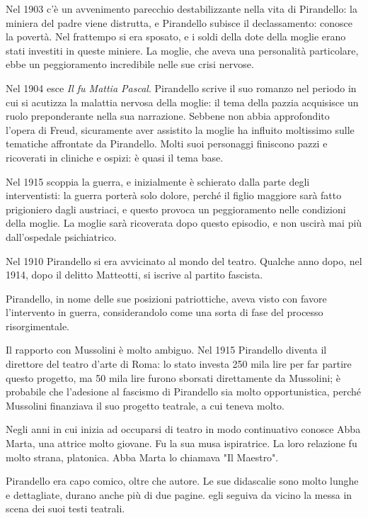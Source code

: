 \documentclass[a4paper, twoside, titlepage]{book}
\begin{document}
Nel 1903 c'è un avvenimento parecchio destabilizzante nella vita di Pirandello: la miniera del padre viene distrutta, e Pirandello subisce il declassamento: conosce la povertà. Nel frattempo si era sposato, e i soldi della dote della moglie erano stati investiti in queste miniere.
La moglie, che aveva una personalità particolare, ebbe un peggioramento incredibile nelle sue crisi nervose.

Nel 1904 esce \textit{Il fu Mattia Pascal}. Pirandello scrive il suo romanzo nel periodo in cui si acutizza la malattia nervosa della moglie: il tema della pazzia acquisisce un ruolo preponderante nella sua narrazione.
Sebbene non abbia approfondito l'opera di Freud, sicuramente aver assistito la moglie ha influito moltissimo sulle tematiche affrontate da Pirandello. Molti suoi personaggi finiscono pazzi e ricoverati in cliniche e ospizi: è quasi il tema base.

Nel 1915 scoppia la guerra, e inizialmente è schierato dalla parte degli interventisti: la guerra porterà solo dolore, perché il figlio maggiore sarà fatto prigioniero dagli austriaci, e questo provoca un peggioramento nelle condizioni della moglie.
La moglie sarà ricoverata dopo questo episodio, e non uscirà mai più dall'ospedale psichiatrico.

Nel 1910 Pirandello si era avvicinato al mondo del teatro.
Qualche anno dopo, nel 1914, dopo il delitto Matteotti, si iscrive al partito fascista.

Pirandello, in nome delle sue posizioni patriottiche, aveva visto con favore l'intervento in guerra, considerandolo come una sorta di fase del processo risorgimentale.

Il rapporto con Mussolini è molto ambiguo. Nel 1915 Pirandello diventa il direttore del teatro d'arte di Roma: lo stato investa 250 mila lire per far partire questo progetto, ma 50 mila lire furono sborsati direttamente da Mussolini; è probabile che l'adesione al fascismo di Pirandello sia molto opportunistica, perché Mussolini finanziava il suo progetto teatrale, a cui teneva molto.

Negli anni in cui inizia ad occuparsi di teatro in modo continuativo conosce Abba Marta, una attrice molto giovane. Fu la sua musa ispiratrice.
La loro relazione fu molto strana, platonica. Abba Marta lo chiamava "Il Maestro".

Pirandello era capo comico, oltre che autore. Le sue didascalie sono molto lunghe e dettagliate, durano anche più di due pagine. egli seguiva da vicino la messa in scena dei suoi testi teatrali.
\end{document}
